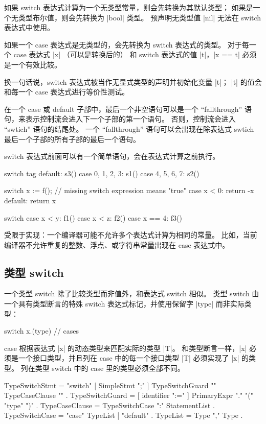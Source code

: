 如果 switch 表达式计算为一个无类型常量，则会先转换为其默认类型；
如果是一个无类型布尔值，则会先转换为 \code|bool| 类型。
预声明无类型值 \code|nil| 无法在 switch 表达式中使用。

如果一个 case 表达式是无类型的，会先转换为 switch 表达式的类型。
对于每一个 case 表达式 \code|x| （可以是转换后的） 和 switch 表达式的值 \code|t|，\code|x == t| 必须是一个有效比较。

换一句话说，switch 表达式被当作无显式类型的声明并初始化变量 \code|t|；
\code|t| 的值会和每一个 case 表达式进行等价性测试。

在一个 case 或 default 子部中，最后一个非空语句可以是一个 ``fallthrough'' 语句，来表示控制流会进入下一个子部的第一个语句。
否则，控制流会进入 ``swtich'' 语句的结尾处。
一个 ``fallthrough'' 语句可以会出现在除表达式 swtich 最后一个子部的所有子部的最后一个语句。

switch 表达式前面可以有一个简单语句，会在表达式计算之前执行。
\begin{golang}
switch tag {
default: s3()
case 0, 1, 2, 3: s1()
case 4, 5, 6, 7: s2()
}

switch x := f(); {  // missing switch expression means "true"
case x < 0: return -x
default: return x
}

switch {
case x < y: f1()
case x < z: f2()
case x == 4: f3()
}
\end{golang}

受限于实现：一个编译器可能不允许多个表达式计算为相同的常量。
比如，当前编译器不允许重复的整数、浮点、或字符串常量出现在 case 表达式中。

\subsection{类型 switch}
一个类型 switch 除了比较类型而非值外，和表达式 switch 相似。
类型 switch 由一个具有类型断言的特殊 switch 表达式标记，并使用保留字 \code|type| 而非实际类型：
\begin{golang}
switch x.(type) {
// cases
}
\end{golang}
case 根据表达式 \code|x| 的动态类型来匹配实际的类型 \code|T|。
和类型断言一样，\code|x| 必须是一个接口类型，并且列在 case 中的每一个接口类型 \code|T| 必须实现了 \code|x| 的类型。
列在类型 switch 中的 case 里的类型必须全部不同。
\begin{EBNF}
TypeSwitchStmt  = "switch" [ SimpleStmt ";" ] TypeSwitchGuard "{" { TypeCaseClause } "}" .
TypeSwitchGuard = [ identifier ":=" ] PrimaryExpr "." "(" "type" ")" .
TypeCaseClause  = TypeSwitchCase ":" StatementList .
TypeSwitchCase  = "case" TypeList | "default" .
TypeList        = Type { "," Type } .
\end{EBNF}

